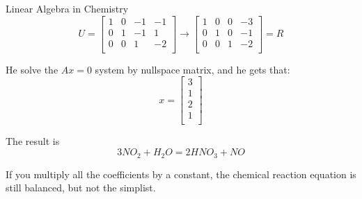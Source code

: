 \documentclass{beamer}
\begin{document}
\begin{frame}{Linear Algebra in Chemistry}
\begin{equation*}
    U=\left[ \begin{matrix}
        1&		0&		-1&		-1\\
        0&		1&		-1&		1\\
        0&		0&		1&		-2\\
    \end{matrix} \right] \rightarrow \left[ \begin{matrix}
        1&		0&		0&		-3\\
        0&		1&		0&		-1\\
        0&		0&		1&		-2\\
    \end{matrix} \right] =R
\end{equation*}

He solve the $Ax=0$ system by nullspace matrix, and he gets that:
\begin{equation*}
    x=\left[ \begin{array}{c}
        3\\
        1\\
        2\\
        1\\
    \end{array} \right]
\end{equation*}

The result is
\begin{equation*}
    3NO_2+H_2O= 2HNO_3+NO
\end{equation*}

If you multiply all the coefficients by a constant, the chemical reaction equation is still balanced, but not the simplist.
\end{frame}
\end{document}
